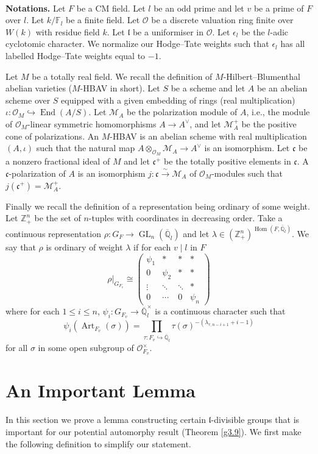 \documentclass[10pt]{article}
\theoremstyle{definition}
\numberwithin{equation}{theorem}
\newcommand{\FF}{\mathbb{F}}
\newcommand{\QQ}{\mathbb{Q}}
\newcommand{\ZZ}{\mathbb{Z}}
\newcommand{\calM}{\mathcal{M}}
\newcommand{\calO}{\mathcal{O}}
\newcommand{\gothc}{\mathfrak{c}}
\newcommand{\gothl}{\mathfrak{l}}
\DeclareMathOperator{\Art}{Art}
\DeclareMathOperator{\End}{End}
\DeclareMathOperator{\GL}{GL}
\DeclareMathOperator{\Hom}{Hom}
\begin{document}
\hspace*{\fill} \\
\textbf{Notations.} Let $F$ be a CM field. Let $l$ be an odd prime and let $v$ be a prime of $F$ over $l$. Let $k/\FF_l$ be a finite field. Let $\calO$ be a discrete valuation ring finite over $W(k)$ with residue field $k$. Let $\gothl$ be a uniformiser in $\calO$. Let $\epsilon_l$ be the $l$-adic cyclotomic character. We normalize our Hodge--Tate weights such that $\epsilon_l$ has all labelled Hodge--Tate weights equal to $-1$.

Let $M$ be a totally real field. We recall the definition of $M$-Hilbert--Blumenthal abelian varieties ($M$-HBAV in short). Let $S$ be a scheme and let $A$ be an abelian scheme over $S$ equipped with a given embedding of rings (real multiplication) $\iota:\calO_M\hookrightarrow\End(A/S)$. Let $\calM_A$ be the polarization module of $A$, i.e., the module of  $\calO_M$-linear symmetric homomorphisms $A\to A^{\vee}$, and let $\calM_A^+$ be the positive cone of polarizations. An $M$-HBAV is an abelian scheme with real multiplication $(A,\iota)$ such that the natural map $A\otimes_{\calO_M}\calM_A\to A^{\vee}$ is an isomorphism. Let $\gothc$ be a nonzero fractional ideal of $M$ and let $\gothc^+$ be the totally positive elements in $\gothc$. A $\gothc$-polarization of $A$ is an isomorphism $j:\gothc\xrightarrow{\sim}\calM_A$ of $\calO_M$-modules such that $j(\gothc^+)=\calM_A^+$.

Finally we recall the definition of a representation being ordinary of some weight. Let $\ZZ^n_+$ be the set of $n$-tuples with coordinates in decreasing order. Take a continuous representation $\rho:G_F\to\GL_n(\overline{\QQ}_l)$ and let $\lambda\in(\ZZ^n_+)^{\Hom(F,\overline{\QQ}_l)}$. We say that $\rho$ is ordinary of weight $\lambda$ if for each $v\mid l$ in $F$
$$\rho|_{G_{F_v}}\cong\left(\begin{array}{cccc}
    \psi_1 & * & * & * \\
    0 & \psi_2 & * & * \\
    \vdots & \ddots & \ddots & * \\
    0 & \cdots & 0 & \psi_n
\end{array}\right)$$
where for each $1\le i\le n$, $\psi_i:G_{F_v}\to \overline{\QQ}_l^\times$ is a continuous character such that $$\psi_i(\Art_{F_v}(\sigma))=\prod_{\tau:F_v\hookrightarrow\overline{\QQ}_l}\tau(\sigma)^{-(\lambda_{\tau,n-i+1}+i-1)}$$ for all $\sigma$ in some open subgroup of $\calO_{F_v}^\times$.

\section{An Important Lemma}
In this section we prove a lemma constructing certain $\gothl$-divisible groups that is important for our potential automorphy result (Theorem \ref{g3.9}). We first make the following definition to simplify our statement. 
\end{document}
